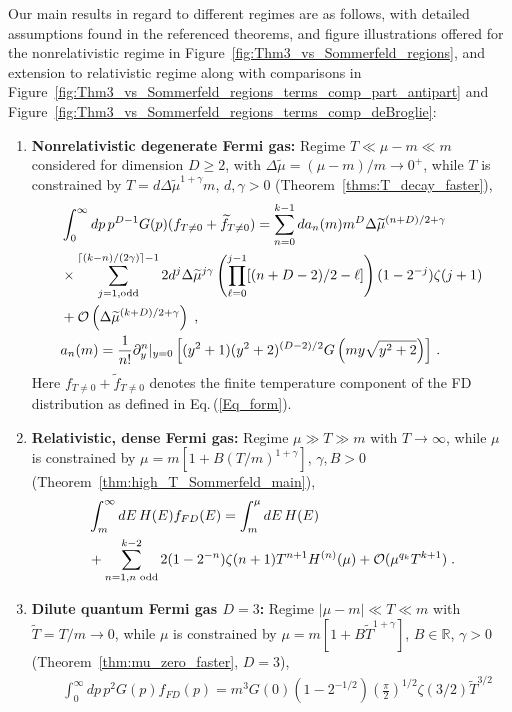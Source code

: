 \documentclass[sn-mathphys,Numbered]{sn-jnl}
\newcommand{\req}[1]{Eq.\,(\ref{#1})}
\newcommand{\rf}[1]{Figure~{\ref{#1}}}
\newcommand{\rTh}[1]{Theorem~{\ref{#1}}}
\begin{document}
 Our main results in regard to different regimes are as follows, with detailed assumptions found in the referenced theorems, and figure illustrations offered for the nonrelativistic regime in \rf{fig:Thm3_vs_Sommerfeld_regions}, and extension to relativistic regime along with comparisons in \rf{fig:Thm3_vs_Sommerfeld_regions_terms_comp_part_antipart} and \rf{fig:Thm3_vs_Sommerfeld_regions_terms_comp_deBroglie}:
\begin{enumerate}
\item 
{\bf Nonrelativistic degenerate Fermi gas:} Regime $T\ll\mu-m\ll m$ considered for dimension $D\geq 2$, with $\Delta\widetilde{\mu}=(\mu-m)/m\to 0^+$, while $T$ is constrained by $T=d\Delta\widetilde{\mu}^{1+\gamma}m$, $d,\gamma>0$ (\rTh{thms:T_decay_faster}),
\begin{align}
 &\int_0^\infty dp\, p^{D-1} G(p)(f_{T\neq 0}+\widetilde{f}_{T\neq 0})=\sum_{n=0}^{k-1} da_n(m)m^{D}\Delta\widetilde{\mu}^{(n+D)/2+\gamma}\\
 &\times\sum_{j=1,\mathrm{odd}}^{\lceil(k-n)/(2\gamma)\rceil-1}
 2d^j\Delta\widetilde{\mu}^{j\gamma}\left(\prod_{\ell=0}^{j-1}[(n+D-2)/2-\ell] \right)(1-2^{-j})\zeta(j+1) \notag\\
 &+\mathcal{O}\left(\Delta\widetilde{\mu}^{(k+D)/2+\gamma}\right)\;,\notag\\
&a_n(m)=\frac{1}{n!}\partial_y^n|_{y=0}\left[ (y^2+1)( y^2+2)^{(D-2)/2} G\left(my\sqrt{y^2+2}\right)\right]\,.
\end{align}
Here $f_{T\neq 0}+\widetilde{f}_{T\neq 0}$ denotes the finite temperature component of the FD distribution as defined in \req{Eq_form}.
\item 
{\bf Relativistic, dense Fermi gas:} Regime $\mu\gg T\gg m$ with $T\to\infty$, while $\mu$ is constrained by $\mu=m[1+B(T/m)^{1+\gamma}]$, $\gamma,B>0$ (\rTh{thm:high_T_Sommerfeld_main}),
\begin{align}
 &\int_m^\infty dE\, H(E)f_{FD}(E)=\int_m^\mu dE\, H(E)\\
&+\sum_{n=1,n\text{ odd}}^{k-2} 2(1-2^{-n})\zeta(n+1)T^{n+1}H^{(n)}(\mu)+\mathcal{O}(\mu^{q_k}T^{k+1})\;.\notag
\end{align} 
\item 
{\bf Dilute quantum Fermi gas $D=3$:} Regime $|\mu-m|\ll T\ll m$ with $\widetilde T=T/m\to 0$, while $\mu$ is constrained by $\mu=m[1+B\widetilde{T}^{1+\gamma}]$, $B\in\mathbb{R}$, $\gamma>0$ (\rTh{thm:mu_zero_faster}, $D=3$),
\begin{align}
&\int_0^\infty dp\, p^{2} G(p) f_{FD}(p) =m^{3}G(0)(1 - 2^{-1/2}) \left(\frac{\pi}{2}\right)^{1/2} \!\!\zeta(3/2)\widetilde{T}^{3/2}\label{eq:thm5_D3_conc}\\

\end{align}
\end{enumerate}
\end{document}

